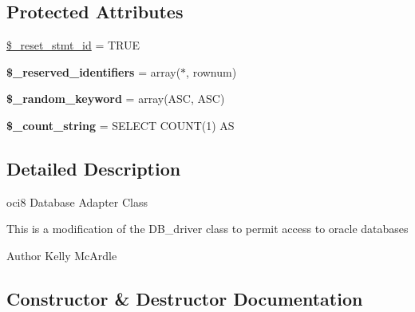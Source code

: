 \subsection*{Protected Attributes}
\begin{DoxyCompactItemize}
\item 
\mbox{\hyperlink{class_c_i___d_b__oci8__driver_aea008510318d9e6d01c0476a4d88894b}{\$\+\_\+reset\+\_\+stmt\+\_\+id}} = T\+R\+UE
\item 
\mbox{\label{class_c_i___d_b__oci8__driver_afd07dd4e2205a42fb64d6bb3b9abce16}} 
{\bfseries \$\+\_\+reserved\+\_\+identifiers} = array(\textquotesingle{}$\ast$\textquotesingle{}, \textquotesingle{}rownum\textquotesingle{})
\item 
\mbox{\label{class_c_i___d_b__oci8__driver_afc629280617fc483a7e7791634e19949}} 
{\bfseries \$\+\_\+random\+\_\+keyword} = array(\textquotesingle{}A\+SC\textquotesingle{}, \textquotesingle{}A\+SC\textquotesingle{})
\item 
\mbox{\label{class_c_i___d_b__oci8__driver_a4ba6ce5fe4e74e467fb95f791d2ec7b9}} 
{\bfseries \$\+\_\+count\+\_\+string} = \textquotesingle{}S\+E\+L\+E\+CT C\+O\+U\+NT(1) AS \textquotesingle{}
\end{DoxyCompactItemize}


\subsection{Detailed Description}
oci8 Database Adapter Class

This is a modification of the D\+B\+\_\+driver class to permit access to oracle databases

\begin{DoxyAuthor}{Author}
Kelly Mc\+Ardle 
\end{DoxyAuthor}


\subsection{Constructor \& Destructor Documentation}
\mbox{\label{class_c_i___d_b__oci8__driver_a2b3f9729c63ae392c0f6b43f6adc14a5}} 
